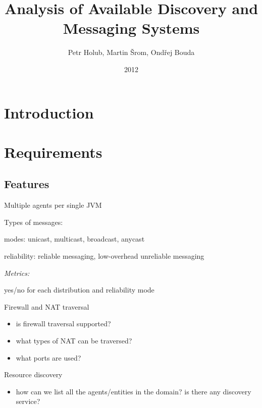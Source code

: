\documentclass[a4paper]{report}
\title{Analysis of Available Discovery and Messaging Systems}
\author{Petr Holub, Martin Šrom, Ondřej Bouda}
\date{2012}
\newenvironment{metrics}{\par\emph{Metrics:}\begin{compactitem}}{\end{compactitem}}
\begin{document}
\maketitle

\tableofcontents


\chapter{Introduction}



\chapter{Requirements}

\section{Features}

\begin{itemize}

\item Multiple agents per single JVM

\item Types of messages:

\begin{compactitem}

\item modes: unicast, multicast, broadcast, anycast

\item reliability: reliable messaging, low-overhead unreliable messaging

\end{compactitem}

\begin{metrics}

\item yes/no for each distribution and reliability mode

\end{metrics}

\item Firewall and NAT traversal

\begin{itemize}

\item is firewall traversal supported?

\item what types of NAT can be traversed?

\item what ports are used?

\end{itemize}

\item Resource discovery

\begin{itemize}

\item how can we list all the agents/entities in the domain? is there any discovery service?

\end{itemize}


\end{itemize}
\end{document}
